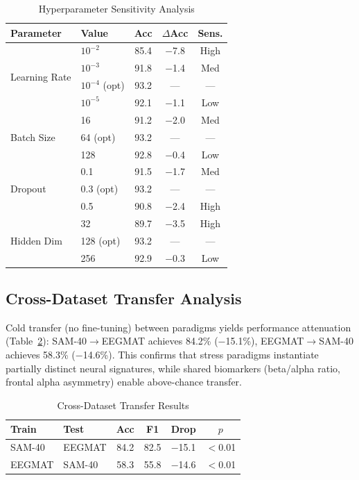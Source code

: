 \documentclass[journal,twoside]{IEEEtran}
\begin{document}
\begin{table}[t]
\centering
\caption{Hyperparameter Sensitivity Analysis}
\label{tab:sensitivity}
\scriptsize
\begin{tabular}{llccc}
\toprule
\textbf{Parameter} & \textbf{Value} & \textbf{Acc} & \textbf{$\Delta$Acc} & \textbf{Sens.} \\
\midrule
\multirow{4}{*}{Learning Rate} & $10^{-2}$ & 85.4 & $-$7.8 & High \\
 & $10^{-3}$ & 91.8 & $-$1.4 & Med \\
 & $10^{-4}$ (opt) & 93.2 & --- & --- \\
 & $10^{-5}$ & 92.1 & $-$1.1 & Low \\
\midrule
\multirow{3}{*}{Batch Size} & 16 & 91.2 & $-$2.0 & Med \\
 & 64 (opt) & 93.2 & --- & --- \\
 & 128 & 92.8 & $-$0.4 & Low \\
\midrule
\multirow{3}{*}{Dropout} & 0.1 & 91.5 & $-$1.7 & Med \\
 & 0.3 (opt) & 93.2 & --- & --- \\
 & 0.5 & 90.8 & $-$2.4 & High \\
\midrule
\multirow{3}{*}{Hidden Dim} & 32 & 89.7 & $-$3.5 & High \\
 & 128 (opt) & 93.2 & --- & --- \\
 & 256 & 92.9 & $-$0.3 & Low \\
\bottomrule
\end{tabular}
\end{table}

\subsection{Cross-Dataset Transfer Analysis}

Cold transfer (no fine-tuning) between paradigms yields performance attenuation (Table~\ref{tab:transfer}): SAM-40$\to$EEGMAT achieves 84.2\% ($-$15.1\%), EEGMAT$\to$SAM-40 achieves 58.3\% ($-$14.6\%). This confirms that stress paradigms instantiate partially distinct neural signatures, while shared biomarkers (beta/alpha ratio, frontal alpha asymmetry) enable above-chance transfer.

\begin{table}[t]
\centering
\caption{Cross-Dataset Transfer Results}
\label{tab:transfer}
\small
\begin{tabular}{llcccc}
\toprule
\textbf{Train} & \textbf{Test} & \textbf{Acc} & \textbf{F1} & \textbf{Drop} & \textbf{$p$} \\
\midrule
SAM-40 & EEGMAT & 84.2 & 82.5 & $-$15.1 & $<$0.01 \\
EEGMAT & SAM-40 & 58.3 & 55.8 & $-$14.6 & $<$0.01 \\
\bottomrule
\end{tabular}
\end{table}
\end{document}

